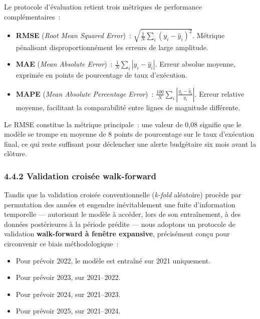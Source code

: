 Le protocole d'\'evaluation retient trois m\'etriques de performance compl\'ementaires~:

\begin{itemize}
    \item \textbf{RMSE} (\textit{Root Mean Squared Error})~:
    $\sqrt{\frac{1}{N}\sum_i (y_i - \hat y_i)^2}$.
    M\'etrique p\'enalisant disproportionn\'ement les erreurs de large amplitude.

    \item \textbf{MAE} (\textit{Mean Absolute Error})~:
    $\frac{1}{N}\sum_i |y_i - \hat y_i|$.
    Erreur absolue moyenne, exprim\'ee en points de pourcentage de taux d'ex\'ecution.

    \item \textbf{MAPE} (\textit{Mean Absolute Percentage Error})~:
    $\frac{100}{N}\sum_i \left|\frac{y_i - \hat y_i}{y_i}\right|$.
    Erreur relative moyenne, facilitant la comparabilit\'e entre lignes de magnitude diff\'erente.
\end{itemize}

\noindent
Le RMSE constitue la m\'etrique principale~: une valeur de 0{,}08 signifie que le
mod\`ele se trompe en moyenne de 8 points de pourcentage sur le taux d'ex\'ecution
final, ce qui reste suffisant pour d\'eclencher une alerte budg\'etaire six mois
avant la cl\^oture.

\subsubsection*{4.4.2 \quad Validation crois\'ee walk-forward}

Tandis que la validation crois\'ee conventionnelle (\textit{k-fold} al\'eatoire) proc\`ede
par permutation des ann\'ees et engendre in\'evitablement une fuite d'information
temporelle --- autorisant le mod\`ele \`a acc\'eder, lors de son entra\^inement, \`a des
donn\'ees post\'erieures \`a la p\'eriode pr\'edite --- nous adoptons un protocole de
validation \textbf{walk-forward \`a fen\^etre expansive}, pr\'ecis\'ement con\c{c}u pour
circonvenir ce biais m\'ethodologique~:

\begin{itemize}
    \item Pour pr\'evoir 2022, le mod\`ele est entra\^in\'e sur 2021 uniquement.
    \item Pour pr\'evoir 2023, sur 2021--2022.
    \item Pour pr\'evoir 2024, sur 2021--2023.
    \item Pour pr\'evoir 2025, sur 2021--2024.
\end{itemize}

